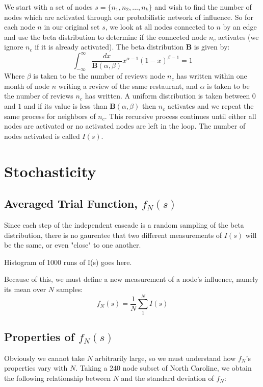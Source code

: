 \documentclass{article}
\begin{document}
	We start with a set of nodes $s = \{n_1,n_2,...,n_k\}$ and wish to find the number of nodes which are activated through our probabilistic network of influence. So for each node $n$ in our original set $s$, we look at all nodes connected to $n$ by an edge and use the beta distribution to determine if the connected node $n_c$ activates (we ignore $n_c$ if it is already activated). The beta distribution $\boldsymbol{B}$ is given by:
	\begin{equation}
	\boxed{
			\int_{-\infty}^{\infty} \frac{dx}{\boldsymbol{B}(\alpha,\beta)}x^{\alpha-1}(1-x)^{\beta - 1} = 1
		}
	\end{equation}
	Where $\beta$ is taken to be the number of reviews node $n_c$ has written within one month of node $n$ writing a review of the same restaurant, and $\alpha$ is taken to be the number of reviews $n_c$ has written. A uniform distribution is taken between $0$ and $1$ and if its value is less than $\boldsymbol{B}(\alpha,\beta)$ then $n_c$ activates and we repeat the same process for neighbors of $n_c$. This recursive process continues until either all nodes are activated or no activated nodes are left in the loop. The number of nodes activated is called $I(s)$.
	
	
	\section{Stochasticity}
	
	\subsection{Averaged Trial Function, $f_N(s)$}
	Since each step of the independent cascade is a random sampling of the beta distribution, there is no gaurentee that two different measurements of $I(s)$ will be the same, or even "close" to one another. 
	
	Histogram of 1000 runs of I(s) goes here.
	
	Because of this, we must define a new measurement of a node's influence, namely its mean over $N$ samples:
		\begin{equation}
		\boxed{
			f_N(s) = \frac{1}{N}\sum_1^N I(s)
		}
		\end{equation}
		
	\subsection{Properties of $f_N(s)$}
	Obviously we cannot take $N$ arbitrarily large, so we must understand how $f_N$'s properties vary with $N$. Taking a 240 node subset of North Caroline, we obtain the following relationship between $N$ and the standard deviation of $f_N$:
	
\end{document}
